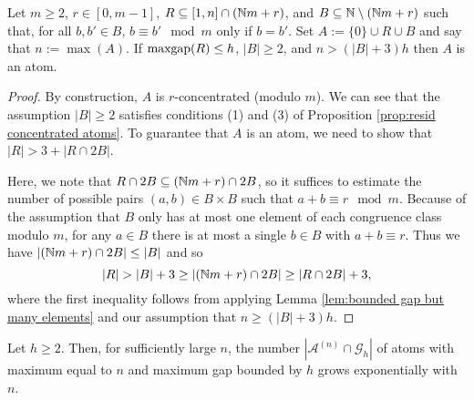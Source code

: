\begin{lemma} \label{lem:R and B for atoms}
Let $m\ge 2$, $r\in [0,m-1]$, $R\subseteq [1,n]\cap (\mathbb{N} m + r)$, and $B \subseteq \mathbb{N} \setminus (\mathbb{N} m + r)$ such that, for all $b,b'\in B$, $b\equiv b' \mod m$ only if $b=b'$.
Set $A := \{0\}\cup R \cup B$ and say that $n:=\max(A)$.
If $\operatorname{maxgap}(R) \le h$, $|B|\ge 2$, and $n > (|B|+3)h$ then $A$ is an atom.
\end{lemma}

\begin{proof}
By construction, $A$ is $r$-concentrated (modulo $m$). 
We can see that the assumption $|B|\ge 2$ satisfies conditions (1) and (3) of Proposition \ref{prop:resid concentrated atoms}.
To guarantee that $A$ is an atom, we need to show that $|R| > 3 + |R\cap 2B|$.

Here, we note that $R\cap 2B \subseteq (\mathbb{N} m + r) \cap 2B$, so it suffices to estimate the number of possible pairs $(a,b)\in B\times B$ such that $a+b\equiv r\mod m$.
Because of the assumption that $B$ only has at most one element of each congruence class modulo $m$, for any $a\in B$ there is at most a single $b\in B$ with $a+b\equiv r$.  
Thus we have $|(\mathbb{N} m + r)\cap 2B | \le |B|$ and so
\[|R| > |B|+3 \ge |(\mathbb{N} m + r) \cap 2B| \ge |R\cap 2B| + 3,\]
where the first inequality follows from applying Lemma \ref{lem:bounded gap but many elements} and our assumption that $n\ge (|B|+3)h$.
\end{proof}

\begin{prop}
Let $h\ge 2$.
Then, for sufficiently large $n$, the number $|\mathcal{A}^{(n)}\cap \mathcal{G}_h|$ of atoms with maximum equal to $n$ and maximum gap bounded by $h$ grows exponentially with $n$.
\end{prop}

